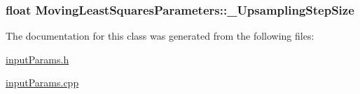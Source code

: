 \hypertarget{classMovingLeastSquaresParameters_af232552a6c8d62b1db80067d9c3deb2c}{
\subsubsection[{\-\_\-\-Upsampling\-Step\-Size}]{\setlength{\rightskip}{0pt plus 5cm}float Moving\-Least\-Squares\-Parameters\-::\-\_\-\-Upsampling\-Step\-Size\hspace{0.3cm}{\ttfamily [private]}}}\label{classMovingLeastSquaresParameters_af232552a6c8d62b1db80067d9c3deb2c}


The documentation for this class was generated from the following files\-:\begin{DoxyCompactItemize}
\item 
\hyperlink{inputParams_8h}{input\-Params.\-h}\item 
\hyperlink{inputParams_8cpp}{input\-Params.\-cpp}\end{DoxyCompactItemize}
